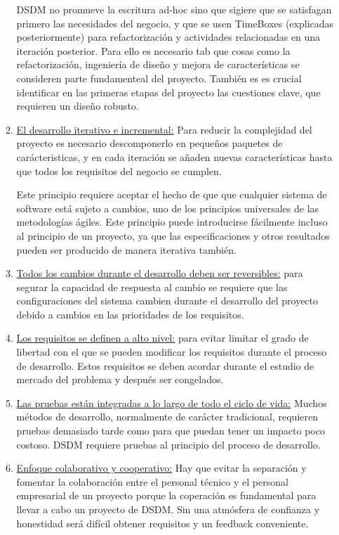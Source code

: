 \documentclass[12pt,a4paper]{article}
\begin{document}
\begin{itemize}
\begin{enumerate}
 
 DSDM no promueve la escritura ad-hoc sino que sigiere que se satisfagan  primero las necesidades del negocio, y que se usen TimeBoxes (explicadas posteriormente) para
refactorización y actividades relacionadas en una iteración posterior. Para ello es necesario tab que cosas como  la refactorización, ingeniería de diseño y mejora de características se consideren parte fundamenteal del proyecto. También es es crucial identificar en las primeras etapas del proyecto las cuestiones clave, que requieren un diseño robusto. 




\item \underline{El desarrollo iterativo e incremental:} 
Para reducir la complejidad del proyecto es necesario descomponerlo en pequeños paquetes de  carácteristicas, y en cada iteración se añaden nuevas características hasta que todos los requisitos del negocio se cumplen.

 Este principio requiere aceptar el hecho de que que cualquier sistema de software está sujeto a cambios, uno de los principios universales de las metodologías ágiles. Este principio puede introducirse fácilmente incluso al principio de un proyecto, ya que las especificaciones y otros resultados pueden ser producido de manera iterativa también. 


\item  \underline{Todos los cambios durante el desarrollo deben ser reversibles:} para segurar la capacidad de respuesta al cambio se requiere que las configuraciones del sistema cambien durante el desarrollo del proyecto debido a cambios en las prioridades de los requisitos.



\item \underline{Los requisitos se definen a alto nivel:} para evitar limitar el grado de libertad con el que se pueden modificar los requisitos durante el proceso de desarrollo.  Estos requisitos se deben acordar durante el estudio de mercado del problema y después ser congelados.

\item  \underline{Las pruebas están integradas a lo largo de todo el ciclo de vida:} Muchos métodos de desarrollo, normalmente de carácter tradicional, requieren pruebas demasiado tarde como para que puedan tener un impacto poco costoso. DSDM requiere pruebas al principio del proceso de desarrollo. 


\item \underline{Enfoque colaborativo y cooperativo:} Hay que evitar la separación y fomentar la colaboración entre el personal técnico y el personal empresarial
de un proyecto porque la coperación es fundamental para llevar a cabo un proyecto de DSDM. Sin una atmósfera de confianza y honestidad será difícil obtener requisitos y un feedback conveniente.
\end{enumerate}



\end{itemize}
\end{document}
